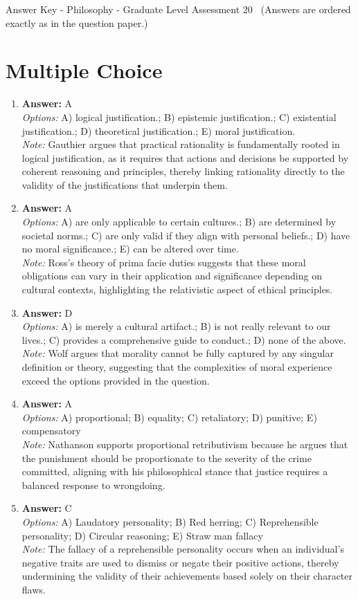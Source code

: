\documentclass[12pt]{article}
\begin{document}
\begin{center}
Answer Key - Philosophy - Graduate Level Assessment 20 \
\small (Answers are ordered exactly as in the question paper.)
\end{center}

\section*{Multiple Choice}
\begin{enumerate}[label=\arabic*.]
\item \textbf{Answer:} A
\\ \textit{Options:} A) logical justification.; B) epistemic justification.; C) existential justification.; D) theoretical justification.; E) moral justification.
\\ \textit{Note:} Gauthier argues that practical rationality is fundamentally rooted in logical justification, as it requires that actions and decisions be supported by coherent reasoning and principles, thereby linking rationality directly to the validity of the justifications that underpin them.
\item \textbf{Answer:} A
\\ \textit{Options:} A) are only applicable to certain cultures.; B) are determined by societal norms.; C) are only valid if they align with personal beliefs.; D) have no moral significance.; E) can be altered over time.
\\ \textit{Note:} Ross's theory of prima facie duties suggests that these moral obligations can vary in their application and significance depending on cultural contexts, highlighting the relativistic aspect of ethical principles.
\item \textbf{Answer:} D
\\ \textit{Options:} A) is merely a cultural artifact.; B) is not really relevant to our lives.; C) provides a comprehensive guide to conduct.; D) none of the above.
\\ \textit{Note:} Wolf argues that morality cannot be fully captured by any singular definition or theory, suggesting that the complexities of moral experience exceed the options provided in the question.
\item \textbf{Answer:} A
\\ \textit{Options:} A) proportional; B) equality; C) retaliatory; D) punitive; E) compensatory
\\ \textit{Note:} Nathanson supports proportional retributivism because he argues that the punishment should be proportionate to the severity of the crime committed, aligning with his philosophical stance that justice requires a balanced response to wrongdoing.
\item \textbf{Answer:} C
\\ \textit{Options:} A) Laudatory personality; B) Red herring; C) Reprehensible personality; D) Circular reasoning; E) Straw man fallacy
\\ \textit{Note:} The fallacy of a reprehensible personality occurs when an individual's negative traits are used to dismiss or negate their positive actions, thereby undermining the validity of their achievements based solely on their character flaws.
\end{enumerate}
\end{document}
